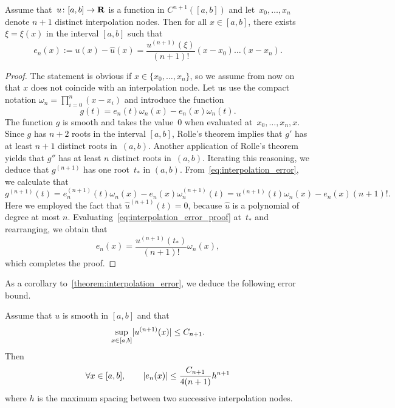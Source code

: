 \begin{theorem}
    \label{theorem:interpolation_error}
    Assume that~$u\colon [a, b] \to \mathbf R$ is a function in $C^{n+1}([a, b])$ and let~$x_0, \dotsc, x_n$ denote $n+1$ distinct interpolation nodes.
    Then for all $x \in [a, b]$,
    there exists~$\xi = \xi(x)$ in the interval $[a, b]$ such that
    \[
        e_n(x) := u(x) - \widehat u(x) = \frac{u^{(n+1)}(\xi)}{(n+1)!} (x-x_0) \dotsc (x - x_n).
    \]
\end{theorem}
\begin{proof}
    The statement is obvious if $x \in \{x_0, \dotsc, x_n\}$,
    so we assume from now on that $x$ does not coincide with an interpolation node.
    Let us use the compact notation $\omega_n = \prod_{i=0}^n (x - x_i)$ and introduce the function
    \begin{equation}
        \label{eq:interpolation_error}
        g(t) = e_n(t) \omega_n(x) - e_n(x) \omega_n(t).
    \end{equation}
    The function $g$ is smooth and takes the value~0 when evaluated at~$x_0, \dotsc, x_n, x$.
    Since $g$ has $n+2$ roots in the interval $[a, b]$,
    Rolle's theorem implies that $g'$ has at least $n+1$ distinct roots in~$(a, b)$.
    Another application of Rolle's theorem yields that $g''$ has at least $n$ distinct roots in~$(a, b)$.
    Iterating this reasoning, we deduce that $g^{(n+1)}$ has one root~$t_*$ in $(a, b)$.
    From~\eqref{eq:interpolation_error},
    we calculate that
    \begin{equation}
        \label{eq:interpolation_error_proof}
        g^{(n+1)}(t) = e_n^{(n+1)}(t) \omega_n(x) - e_n(x) \omega_n^{(n+1)}(t)
        = u^{(n+1)}(t) \omega_n(x) - e_n(x) (n+1)!.
    \end{equation}
    Here we employed the fact that $\widehat u^{(n+1)}(t) = 0$,
    because $\widehat u$ is a polynomial of degree at most $n$.
    Evaluating~\eqref{eq:interpolation_error_proof} at~$t_*$ and rearranging,
    we obtain that
    \[
        e_n(x) = \frac{u^{(n+1)}(t_*)}{(n+1)!} \omega_n(x),
    \]
    which completes the proof.
\end{proof}
As a corollary to~\cref{theorem:interpolation_error},
we deduce the following error bound.
\begin{corollary}
    \label{corollary:interpolation_error}
    Assume that $u$ is smooth in $[a, b]$ and that
    \[
        \sup_{x \in [a, b]} \lvert u^{(n+1)}(x)\rvert \leq C_{n+1}.
    \]
    Then
    \begin{equation}
        \label{eq:upper_bound_interp_error}
        \forall x \in [a, b], \qquad
        \lvert e_n(x)\rvert \leq \frac{C_{n+1}}{4(n+1)} h^{n+1}
    \end{equation}
    where $h$ is the maximum spacing between two successive interpolation nodes.
\end{corollary}
